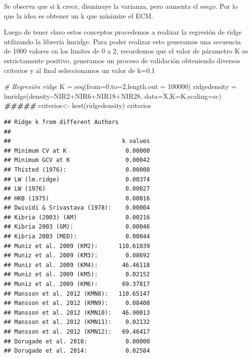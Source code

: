 \documentclass[
]{article}
\newenvironment{Shaded}{\begin{snugshade}}{\end{snugshade}}
\newcommand{\AttributeTok}[1]{\textcolor[rgb]{0.77,0.63,0.00}{#1}}
\newcommand{\CommentTok}[1]{\textcolor[rgb]{0.56,0.35,0.01}{\textit{#1}}}
\newcommand{\DecValTok}[1]{\textcolor[rgb]{0.00,0.00,0.81}{#1}}
\newcommand{\DocumentationTok}[1]{\textcolor[rgb]{0.56,0.35,0.01}{\textbf{\textit{#1}}}}
\newcommand{\FunctionTok}[1]{\textcolor[rgb]{0.00,0.00,0.00}{#1}}
\newcommand{\NormalTok}[1]{#1}
\newcommand{\OtherTok}[1]{\textcolor[rgb]{0.56,0.35,0.01}{#1}}
\newcommand{\SpecialCharTok}[1]{\textcolor[rgb]{0.00,0.00,0.00}{#1}}
\newcommand{\StringTok}[1]{\textcolor[rgb]{0.31,0.60,0.02}{#1}}
\begin{document}
Se observa que si k crece, disminuye la varianza, pero aumenta el sesgo.
Por lo que la idea es obtener un k que minimize el ECM.

Luego de tener claro estos conceptos procedemos a realizar la regresión
de ridge utilizando la librería lmridge. Para poder realizar esto
generamos una secuencia de 1000 valores en los limites de 0 a 2,
recordemos que el valor de párametro K es estrictamente positivo,
generamos un proceso de validación obteniendo diversos criterios y al
final seleccionamos un valor de k=0.1

\begin{Shaded}
\begin{Highlighting}[]
\CommentTok{\# Regresión ridge}
\NormalTok{K }\OtherTok{=} \FunctionTok{seq}\NormalTok{(}\AttributeTok{from=}\DecValTok{0}\NormalTok{,}\AttributeTok{to=}\DecValTok{2}\NormalTok{,}\AttributeTok{length.out =} \DecValTok{100000}\NormalTok{)}
\NormalTok{ridgedensity }\OtherTok{=} \FunctionTok{lmridge}\NormalTok{(density}\SpecialCharTok{\textasciitilde{}}\NormalTok{NIR2}\SpecialCharTok{+}\NormalTok{NIR6}\SpecialCharTok{+}\NormalTok{NIR18}\SpecialCharTok{+}\NormalTok{NIR28,}
                       \AttributeTok{data=}\NormalTok{X,}\AttributeTok{K=}\NormalTok{K,}\AttributeTok{scaling=}\StringTok{\textquotesingle{}sc\textquotesingle{}}\NormalTok{)}
\DocumentationTok{\#\#\#\#\#}
\NormalTok{criterios}\OtherTok{\textless{}{-}} \FunctionTok{kest}\NormalTok{(ridgedensity)}
\NormalTok{criterios}
\end{Highlighting}
\end{Shaded}

\begin{verbatim}
## Ridge k from different Authors
## 
##                                k values
## Minimum CV at K                 0.00000
## Minimum GCV at K                0.00042
## Thisted (1976):                 0.00008
## LW (lm.ridge)                   0.00374
## LW (1976)                       0.00027
## HKB (1975)                      0.00016
## Dwividi & Srivastava (1978):    0.00004
## Kibria (2003) (AM)              0.00216
## Kibria 2003 (GM):               0.00046
## Kibria 2003 (MED):              0.00044
## Muniz et al. 2009 (KM2):      110.61039
## Muniz et al. 2009 (KM3):        0.08692
## Muniz et al. 2009 (KM4):       46.46118
## Muniz et al. 2009 (KM5):        0.02152
## Muniz et al. 2009 (KM6):       69.37817
## Mansson et al. 2012 (KMN8):   110.65147
## Mansson et al. 2012 (KMN9):     0.08408
## Mansson et al. 2012 (KMN10):   46.90013
## Mansson et al. 2012 (KMN11):    0.02132
## Mansson et al. 2012 (KMN12):   69.46417
## Dorugade et al. 2010:           0.00000
## Dorugade et al. 2014:           0.02584
\end{verbatim}
\end{document}
